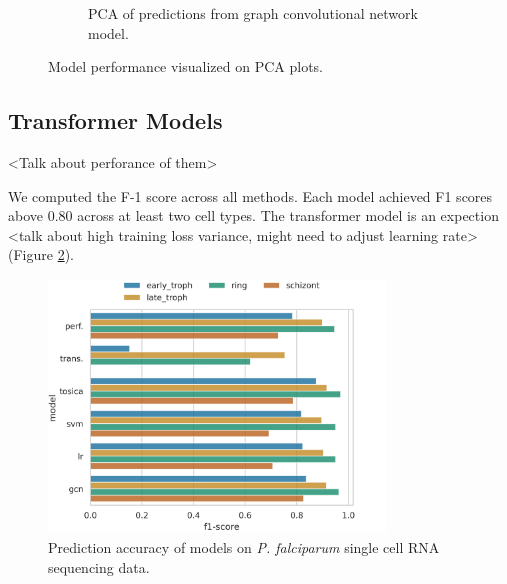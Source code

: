 \documentclass{article}
\begin{document}
\begin{figure}[!h]
\begin{subfigure}[b]{0.3\textwidth}
      \caption{PCA of predictions from graph convolutional network model.}
  \end{subfigure}
  
  \caption{Model performance visualized on PCA plots.}
  \label{fig:pfal_pca_pred}
\end{figure}

\subsection{Transformer Models}

<Talk about perforance of them>

We computed the F-1 score across all methods. Each model achieved F1 scores above 0.80 across at least two cell types. The transformer model is an expection <talk about high training loss variance, might need to adjust learning rate>(Figure \ref{fig:pfal_pred_f1}).

\begin{figure}[H]
  \centering
  \includegraphics[width=0.8\textwidth]{figures/f1_scores_bar.png}
  \caption{Prediction accuracy of models on \textit{P. falciparum} single cell RNA sequencing data.}
	\label{fig:pfal_pred_f1}
\end{figure}
\end{document}
